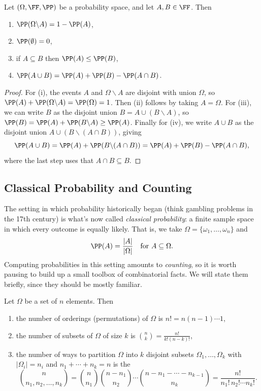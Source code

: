 \begin{proposition}
	Let $(\Omega, \FF, \PP)$ be a probability space, and let $A, B \in \FF$. Then
	\begin{enumerate}[label=(\roman*)]
		\item $\PP(\Omega \backslash A) = 1 - \PP(A)$,
		\item $\PP(\emptyset) = 0$,
		\item if $A \subseteq B$ then $\PP(A) \leq \PP(B)$,
		\item $\PP(A \cup B) = \PP(A) + \PP(B) - \PP(A \cap B)$.
	\end{enumerate}
\end{proposition}
\begin{proof}
	For (i), the events $A$ and $\Omega \backslash A$ are disjoint with union $\Omega$, so $\PP(A) + \PP(\Omega \backslash A) = \PP(\Omega) = 1$. Then (ii) follows by taking $A = \Omega$. For (iii), we can write $B$ as the disjoint union $B = A \cup (B \backslash A)$, so $\PP(B) = \PP(A) + \PP(B \backslash A) \geq \PP(A)$. Finally for (iv), we write $A \cup B$ as the disjoint union $A \cup (B \backslash (A \cap B))$, giving
	$$
	\PP(A \cup B) = \PP(A) + \PP(B \backslash (A \cap B)) = \PP(A) + \PP(B) - \PP(A \cap B),
	$$
	where the last step uses that $A \cap B \subseteq B$.
\end{proof}

\subsection{Classical Probability and Counting}

The setting in which probability historically began (think gambling problems in the 17th century) is what's now called \emph{classical probability}: a finite sample space in which every outcome is equally likely. That is, we take $\Omega = \{\omega_1, \dots, \omega_n\}$ and
$$
\PP(A) = \frac{|A|}{|\Omega|} \quad \text{for } A \subseteq \Omega.
$$
Computing probabilities in this setting amounts to \emph{counting}, so it is worth pausing to build up a small toolbox of combinatorial facts. We will state them briefly, since they should be mostly familiar.

\begin{fact}
	Let $\Omega$ be a set of $n$ elements. Then
	\begin{enumerate}[label=(\roman*)]
		\item the number of orderings (permutations) of $\Omega$ is $n! = n(n-1) \cdots 1$,
		\item the number of subsets of $\Omega$ of size $k$ is $\binom{n}{k} = \frac{n!}{k!(n - k)!}$,
		\item the number of ways to partition $\Omega$ into $k$ disjoint subsets $\Omega_1, \dots, \Omega_k$ with $|\Omega_i| = n_i$ and $n_1 + \cdots + n_k = n$ is the 
		$$
		\binom{n}{n_1, n_2, \dots, n_k} = \binom{n}{n_1}\binom{n - n_1}{n_2} \cdots \binom{n - n_1 - \cdots - n_{k - 1}}{n_k} = \frac{n!}{n_1! \, n_2! \cdots n_k!}.
		$$
	\end{enumerate}
\end{fact}

